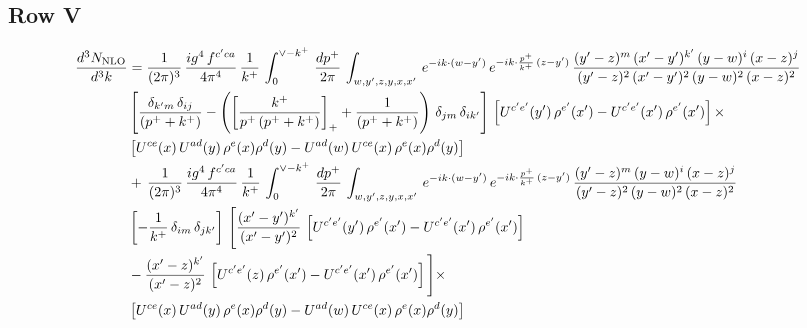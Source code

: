 \documentclass[9pt]{article}
\numberwithin{equation}{section}
\begin{document}
\subsection{Row V}
\begin{align}
\frac{d^{3}N_{\rm NLO}}{d^{3}k} & = \frac{1}{(2\pi)^{3}}\, \frac{ig^{4}\,f^{c'ca}}{4\pi^{4}}\, \frac{1}{k^{+}}\,\int_{0}^{\vee - k^{+}}\, \frac{dp^{+}}{2\pi}\, \int_{w,y',z,y,x,x'}\, e^{-ik\cdot (w-y')}\, e^{-ik\cdot \frac{p^{+}}{k^{+}}\,(z-y')}\,\frac{(y'-z)^{m}\,(x'-y')^{k'}\,(y-w)^{i}\,(x-z)^{j}}{(y'-z)^{2}\,(x'-y')^{2}\,(y-w)^{2}\,(x-z)^{2}}\notag \\ & \left[\frac{\delta_{k'm}\,\delta_{ij}}{(p^{+}+k^{+})}-\left(\left[\frac{k^{+}}{p^{+}\,(p^{+}+k^{+})}\right]_{+}+\frac{1}{(p^{+}+k^{+})}\right)\,\delta_{jm}\,\delta_{ik'}\right]\, \left[U^{c'e'}(y')\,\rho^{e'}(x')-U^{c'e'}(x')\,\rho^{e'}(x')\right]\times \notag \\ & \left[U^{ce}(x)\,U^{ad}(y)\,\rho^{e}(x)\rho^{d}(y)-U^{ad}(w)\,U^{ce}(x)\,\rho^{e}(x)\rho^{d}(y)\right]\notag \\&   +\,\frac{1}{(2\pi)^{3}}\, \frac{ig^{4}\,f^{c'ca}}{4\pi^{4}}\, \frac{1}{k^{+}}\,\int_{0}^{\vee - k^{+}}\, \frac{dp^{+}}{2\pi}\, \int_{w,y',z,y,x,x'}\, e^{-ik\cdot (w-y')}\, e^{-ik\cdot \frac{p^{+}}{k^{+}}\,(z-y')}\,\frac{(y'-z)^{m}\,(y-w)^{i}\,(x-z)^{j}}{(y'-z)^{2}\,(y-w)^{2}\,(x-z)^{2}}\notag \\ & \left[-\frac{1}{k^{+}}\, \delta_{im}\, \delta_{jk'}\right]\, \Bigg[\frac{(x'-y')^{k'}}{(x'-y')^{2}}\,\left[U^{c'e'}(y')\,\rho^{e'}(x')-U^{c'e'}(x')\,\rho^{e'}(x')\right]\notag \\ &-\frac{(x'-z)^{k'}}{(x'-z)^{2}}\,\left[U^{c'e'}(z)\,\rho^{e'}(x')-U^{c'e'}(x')\,\rho^{e'}(x')\right]\Bigg]\times \notag \\ &\left[U^{ce}(x)\,U^{ad}(y)\,\rho^{e}(x)\rho^{d}(y)-U^{ad}(w)\,U^{ce}(x)\,\rho^{e}(x)\rho^{d}(y)\right]
\end{align}
\end{document}
